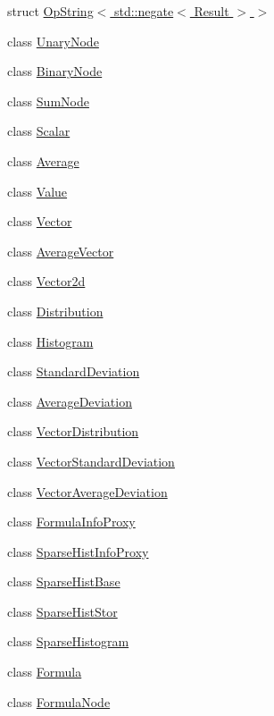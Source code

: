 \begin{DoxyCompactItemize}
\item 
struct \hyperlink{structStats_1_1OpString_3_01std_1_1negate_3_01Result_01_4_01_4}{OpString$<$ std::negate$<$ Result $>$ $>$}
\item 
class \hyperlink{classStats_1_1UnaryNode}{UnaryNode}
\item 
class \hyperlink{classStats_1_1BinaryNode}{BinaryNode}
\item 
class \hyperlink{classStats_1_1SumNode}{SumNode}
\item 
class \hyperlink{classStats_1_1Scalar}{Scalar}
\item 
class \hyperlink{classStats_1_1Average}{Average}
\item 
class \hyperlink{classStats_1_1Value}{Value}
\item 
class \hyperlink{classStats_1_1Vector}{Vector}
\item 
class \hyperlink{classStats_1_1AverageVector}{AverageVector}
\item 
class \hyperlink{classStats_1_1Vector2d}{Vector2d}
\item 
class \hyperlink{classStats_1_1Distribution}{Distribution}
\item 
class \hyperlink{classStats_1_1Histogram}{Histogram}
\item 
class \hyperlink{classStats_1_1StandardDeviation}{StandardDeviation}
\item 
class \hyperlink{classStats_1_1AverageDeviation}{AverageDeviation}
\item 
class \hyperlink{classStats_1_1VectorDistribution}{VectorDistribution}
\item 
class \hyperlink{classStats_1_1VectorStandardDeviation}{VectorStandardDeviation}
\item 
class \hyperlink{classStats_1_1VectorAverageDeviation}{VectorAverageDeviation}
\item 
class \hyperlink{classStats_1_1FormulaInfoProxy}{FormulaInfoProxy}
\item 
class \hyperlink{classStats_1_1SparseHistInfoProxy}{SparseHistInfoProxy}
\item 
class \hyperlink{classStats_1_1SparseHistBase}{SparseHistBase}
\item 
class \hyperlink{classStats_1_1SparseHistStor}{SparseHistStor}
\item 
class \hyperlink{classStats_1_1SparseHistogram}{SparseHistogram}
\item 
class \hyperlink{classStats_1_1Formula}{Formula}
\item 
class \hyperlink{classStats_1_1FormulaNode}{FormulaNode}

\end{DoxyCompactItemize}
